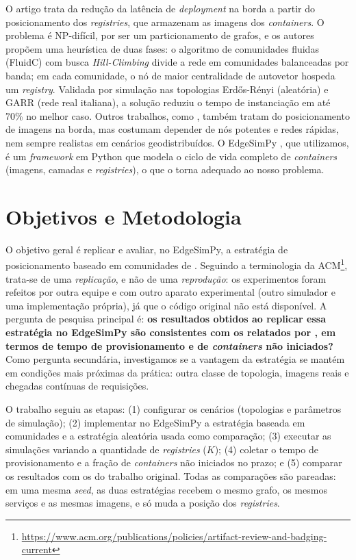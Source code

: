 \documentclass[12pt]{article}
\begin{document}
O artigo trata da redução da latência de \textit{deployment} na borda a partir do
posicionamento dos \textit{registries}, que armazenam as imagens dos
\textit{containers}. O problema é NP-difícil, por ser um particionamento de
grafos, e os autores propõem uma heurística de duas fases: o algoritmo de
comunidades fluidas (FluidC) \cite{pares2017} com busca \textit{Hill-Climbing}
divide a rede em comunidades balanceadas por banda; em cada comunidade, o nó de
maior centralidade de autovetor hospeda um \textit{registry}. Validada por
simulação nas topologias Erdős-Rényi (aleatória) e GARR (rede real italiana), a
solução reduziu o tempo de instanciação em até 70\% no melhor caso. Outros
trabalhos, como \cite{darrous2019}, também tratam do posicionamento de imagens na
borda, mas costumam depender de nós potentes e redes rápidas, nem sempre
realistas em cenários geodistribuídos. O EdgeSimPy \cite{souza2023}, que
utilizamos, é um \textit{framework} em Python que modela o ciclo de vida
completo de \textit{containers} (imagens, camadas e \textit{registries}), o que o
torna adequado ao nosso problema.

\section{Objetivos e Metodologia}
\label{sec:metodologia}

O objetivo geral é replicar e avaliar, no EdgeSimPy, a estratégia de
posicionamento baseado em comunidades de \cite{knob2021}. Seguindo a terminologia
da ACM\footnote{\url{https://www.acm.org/publications/policies/artifact-review-and-badging-current}},
trata-se de uma \textit{replicação}, e não de uma \textit{reprodução}: os
experimentos foram refeitos por outra equipe e com outro aparato experimental
(outro simulador e uma implementação própria), já que o código original não está
disponível. A pergunta de pesquisa
principal é: \textbf{os resultados obtidos ao replicar essa estratégia no
EdgeSimPy são consistentes com os relatados por \cite{knob2021}, em termos de
tempo de provisionamento e de \textit{containers} não iniciados?} Como pergunta
secundária, investigamos se a vantagem da estratégia se mantém em condições mais
próximas da prática: outra classe de topologia, imagens reais e chegadas
contínuas de requisições.

O trabalho seguiu as etapas: (1) configurar os cenários (topologias e parâmetros
de simulação); (2) implementar no EdgeSimPy a estratégia baseada em comunidades
e a estratégia aleatória usada como comparação; (3) executar as simulações
variando a quantidade de \textit{registries} ($K$); (4) coletar o tempo de
provisionamento e a fração de \textit{containers} não iniciados no prazo; e (5)
comparar os resultados com os do trabalho original. Todas as comparações são
pareadas: em uma mesma \textit{seed}, as duas estratégias recebem o mesmo grafo,
os mesmos serviços e as mesmas imagens, e só muda a posição dos
\textit{registries}.
\end{document}
